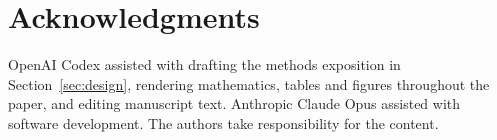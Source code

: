 \section*{Acknowledgments}
OpenAI Codex assisted with drafting the methods exposition in
Section~\ref{sec:design}, rendering mathematics, tables and figures throughout
the paper, and editing manuscript text.
Anthropic Claude Opus assisted with software development.
The authors take responsibility for the content.
